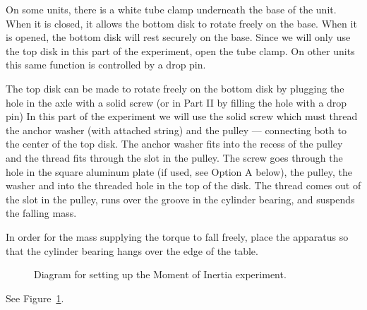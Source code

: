 On some units, there is a white tube clamp underneath the base of
the unit.  When it is closed, it allows the bottom disk to rotate freely on
the base.  When it is opened, the bottom disk will rest securely on the base.
Since we will only use the top disk in this part of the experiment, open the
tube clamp.  On other units this same function is controlled by a drop pin.

The top disk can be made to rotate freely on the bottom disk by plugging
the hole in the axle with a solid screw (or in Part II by filling
the hole with a drop pin)
In this part of the experiment we will use the solid screw which must
thread the anchor washer (with attached string) and the pulley --- connecting both to the center of the top disk.
The anchor washer fits into the recess of
the pulley and the thread fits through the slot in the pulley.  The screw goes
through the hole in the square aluminum plate (if used, see Option A below), the pulley, the washer and into
the threaded hole in the top of the disk.  The thread comes out of the slot in
the pulley, runs over the groove in the cylinder bearing, and suspends the
falling mass.

In order for the mass supplying the torque to fall freely, place the apparatus
so that the cylinder bearing hangs over the edge of the table.
\begin{figure}
\begin{center}
{}
\end{center}
\caption{Diagram for setting up the Moment of Inertia experiment.
  \label{fig:rot2}}
\end{figure}
See Figure~\ref{fig:rot2}.  

